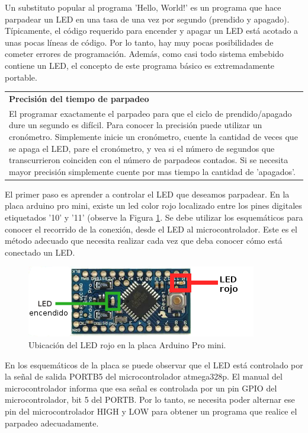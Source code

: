 \documentclass[output=paper, 
colorlinks,
citecolor=brown,
newtxmath
]{langscibook}
\begin{document}
Un substituto popular al programa 'Hello, World!' es un programa que
hace parpadear un LED en una tasa de una vez por segundo (prendido y apagado).
Típicamente, el código requerido para encender y apagar un LED está
acotado a unas pocas líneas de código. Por lo tanto, hay muy pocas posibilidades
de cometer errores de programación. Además, como casi todo sistema
embebido contiene un LED, el concepto de este programa básico es extremadamente
portable.


\begin{center}
\begin{tabularx}{\textwidth}{|X|}
\hline
\rowcolor{aliceblue}
\textbf{Precisión del tiempo de parpadeo}\\
El programar exactamente el parpadeo para que el ciclo de prendido/apagado
dure un segundo es difícil. Para conocer la precisión puede utilizar un
cronómetro. Simplemente inicie un cronómetro, cuente la cantidad de veces
que se apaga el LED, pare el cronómetro, y vea si el número de segundos
que transcurrieron coinciden con el número de parpadeos contados.
Si se necesita mayor precisión simplemente cuente por mas tiempo la cantidad de 'apagados'.\\
\hline
\end{tabularx}
\end{center}


El primer paso es aprender a controlar el LED que deseamos parpadear.
En la placa arduino pro mini, existe un led color rojo localizado entre los
pines digitales etiquetados '10' y '11' 
(observe la Figura \ref{fig:ledrojo}. Se debe utilizar los esquemáticos
para conocer el recorrido de la conexión, desde el LED al microcontrolador.
Este es el método adecuado que necesita realizar cada vez que deba
conocer cómo está conectado un LED.

\begin{figure}
\includegraphics{images/led.png}
\caption{Ubicación del LED rojo en la placa Arduino Pro mini.}
\label{fig:ledrojo}
\end{figure}


En los esquemáticos de la placa se puede observar que el LED está controlado por la señal de salida PORTB5 del microcontrolador atmega328p.
El manual del microcontrolador informa que esa señal es controlada por
un pin GPIO del microcontrolador, bit 5 del PORTB. Por lo tanto,
se necesita poder alternar ese pin del microcontrolador HIGH y LOW
para obtener un programa que realice el parpadeo adecuadamente.
\end{document}
